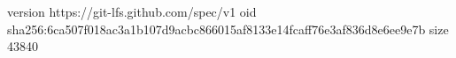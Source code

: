 version https://git-lfs.github.com/spec/v1
oid sha256:6ca507f018ac3a1b107d9acbc866015af8133e14fcaff76e3af836d8e6ee9e7b
size 43840
